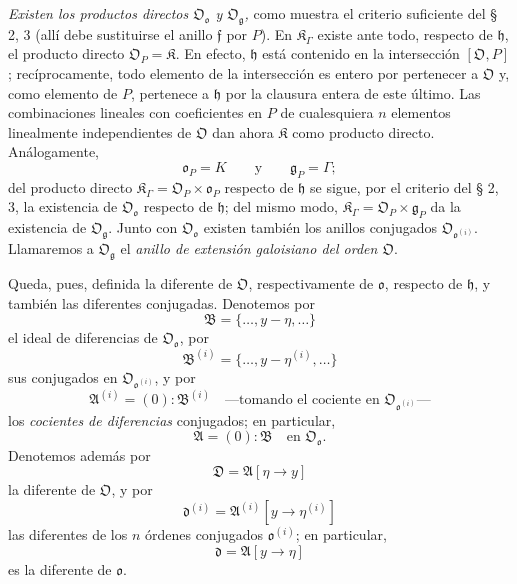 \emph{Existen los productos directos $\mathfrak O_{\mathfrak o}$ y $\mathfrak O_{\mathfrak g}$,} como muestra el criterio suficiente del § 2, 3 (allí debe sustituirse el anillo $\mathfrak f$ por $P$). En $\mathfrak K_\Gamma$ existe ante todo, respecto de $\mathfrak h$, el producto directo $\mathfrak O_P=\mathfrak K$. En efecto, $\mathfrak h$ está contenido en la intersección $[\mathfrak O,P]$; recíprocamente, todo elemento de la intersección es entero por pertenecer a $\mathfrak O$ y, como elemento de $P$, pertenece a $\mathfrak h$ por la clausura entera de este último. Las combinaciones lineales con coeficientes en $P$ de cualesquiera $n$ elementos linealmente independientes de $\mathfrak O$ dan ahora $\mathfrak K$ como producto directo. Análogamente,
\[
\mathfrak o_P=K
\qquad\text{y}\qquad
\mathfrak g_P=\Gamma;
\]
del producto directo $\mathfrak K_\Gamma=\mathfrak O_P\times\mathfrak o_P$ respecto de $\mathfrak h$ se sigue, por el criterio del § 2, 3, la existencia de $\mathfrak O_{\mathfrak o}$ respecto de $\mathfrak h$; del mismo modo, $\mathfrak K_\Gamma=\mathfrak O_P\times\mathfrak g_P$ da la existencia de $\mathfrak O_{\mathfrak g}$. Junto con $\mathfrak O_{\mathfrak o}$ existen también los anillos conjugados $\mathfrak O_{\mathfrak o^{(i)}}$. Llamaremos a $\mathfrak O_{\mathfrak g}$ el \emph{anillo de extensión galoisiano del orden $\mathfrak O$}.

Queda, pues, definida la diferente de $\mathfrak O$, respectivamente de $\mathfrak o$, respecto de $\mathfrak h$, y también las diferentes conjugadas. Denotemos por
\[
\mathfrak B=\{\ldots,y-\eta,\ldots\}
\]
el ideal de diferencias de $\mathfrak O_{\mathfrak o}$, por
\[
\mathfrak B^{(i)}=\{\ldots,y-\eta^{(i)},\ldots\}
\]
sus conjugados en $\mathfrak O_{\mathfrak o^{(i)}}$, y por
\[
\mathfrak A^{(i)}=(0):\mathfrak B^{(i)}
\quad\text{---tomando el cociente en $\mathfrak O_{\mathfrak o^{(i)}}$---}
\]
los \emph{cocientes de diferencias} conjugados; en particular,
\[
\mathfrak A=(0):\mathfrak B\quad\text{en }\mathfrak O_{\mathfrak o}.
\]
Denotemos además por
\[
\mathfrak D=\mathfrak A[\eta\to y]
\]
la diferente de $\mathfrak O$, y por
\[
\mathfrak d^{(i)}=\mathfrak A^{(i)}[y\to\eta^{(i)}]
\]
las diferentes de los $n$ órdenes conjugados $\mathfrak o^{(i)}$; en particular,
\[
\mathfrak d=\mathfrak A[y\to\eta]
\]
es la diferente de $\mathfrak o$.

